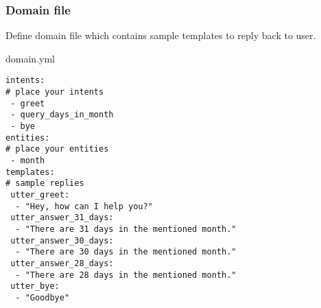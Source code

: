 






 \begin{frame}[fragile]\frametitle{Domain file}
Define domain file which contains sample templates to reply back to user.

domain.yml
\begin{lstlisting}
intents:
# place your intents
 - greet
 - query_days_in_month
 - bye
entities:
# place your entities
 - month
templates:
# sample replies
 utter_greet:
  - "Hey, how can I help you?"
 utter_answer_31_days:
  - "There are 31 days in the mentioned month."
 utter_answer_30_days:
  - "There are 30 days in the mentioned month."
 utter_answer_28_days:
  - "There are 28 days in the mentioned month."
 utter_bye:
  - "Goodbye"
\end{lstlisting}
\end{frame}

